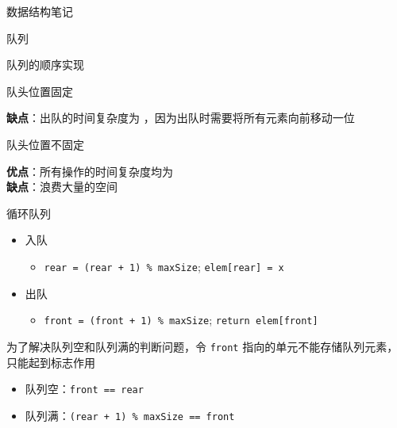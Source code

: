 \documentclass[
  ignorenonframetext,
]{beamer}
\providecommand{\tightlist}{%
  \setlength{\itemsep}{0pt}\setlength{\parskip}{0pt}}
\begin{document}
\begin{frame}[fragile]{数据结构笔记}
\begin{block}{队列}
\begin{block}{队列的顺序实现}
\begin{block}{队头位置固定}
\protect{}\label{ux961fux5934ux4f4dux7f6eux56faux5b9a}

\textbf{缺点}：出队的时间复杂度为
{}，因为出队时需要将所有元素向前移动一位
\end{block}

\begin{block}{队头位置不固定}
\protect{}\label{ux961fux5934ux4f4dux7f6eux4e0dux56faux5b9a}

\textbf{优点}：所有操作的时间复杂度均为 {}\\
\textbf{缺点}：浪费大量的空间
\end{block}

\begin{block}{循环队列}
\protect{}\label{ux5faaux73afux961fux5217}

\begin{itemize}
\tightlist
\item
  入队

  \begin{itemize}
  \tightlist
  \item
    \texttt{rear\ =\ (rear\ +\ 1)\ \%\ maxSize};
    \texttt{elem{[}rear{]}\ =\ x}
  \end{itemize}
\item
  出队

  \begin{itemize}
  \tightlist
  \item
    \texttt{front\ =\ (front\ +\ 1)\ \%\ maxSize};
    \texttt{return\ elem{[}front{]}}
  \end{itemize}
\end{itemize}

为了解决队列空和队列满的判断问题，令 \texttt{front}
指向的单元不能存储队列元素，只能起到标志作用

\begin{itemize}
\tightlist
\item
  队列空：\texttt{front\ ==\ rear}
\item
  队列满：\texttt{(rear\ +\ 1)\ \%\ maxSize\ ==\ front}
\end{itemize}


\end{block}
\end{block}
\end{block}
\end{frame}
\end{document}
